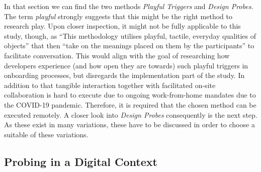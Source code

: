 In that section we can find the two methods \textit{Playful Triggers} and \textit{Design Probes}. The term \textit{playful} strongly suggests that this might be the right method to research play. Upon closer inspection, it might not be fully applicable to this study, though, as \enquote{This methodology utilises playful, tactile, everyday qualities of objects} \cite[p. 16]{akama2010community} that then \enquote{take on the meanings placed on them by the participants} \cite[p. 16]{akama2010community} to facilitate conversation. This would align with the goal of researching how developers experience (and how open they are towards) such playful triggers in onboarding processes, but disregards the implementation part of the study. In addition to that tangible interaction together with facilitated on-site collaboration is hard to execute due to ongoing work-from-home mandates due to the COVID-19 pandemic. Therefore, it is required that the chosen method can be executed remotely. A closer look into \textit{Design Probes} consequently is the next step. As these exist in many variations, these have to be discussed in order to choose a suitable of these variations.

\subsection{Probing in a Digital Context}

